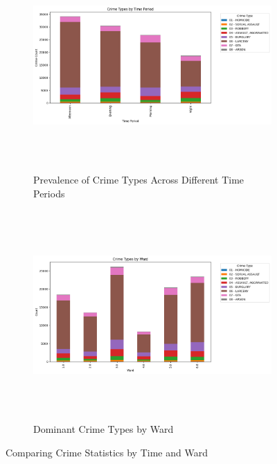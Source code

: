 \documentclass{report}
\begin{document}
        \begin{figure}[!t]
          \begin{subfigure}{1.0\textwidth}
            \includegraphics[width=1.25\linewidth, height=8cm, scale=1.5]{crime-types-by-time}
            \caption{Prevalence of Crime Types Across Different Time Periods}
            \label{fig:crime-type-by-time}
          \end{subfigure}
          \begin{subfigure}{1.0\textwidth}
            \includegraphics[width=1.25\linewidth, height=8cm]{crime-types-by-ward}
            \caption{Dominant Crime Types by Ward}
            \label{fig:crime-type-by-ward}
          \end{subfigure}
          \caption{Comparing Crime Statistics by Time and Ward}
        \end{figure}
	
	
\end{document}
